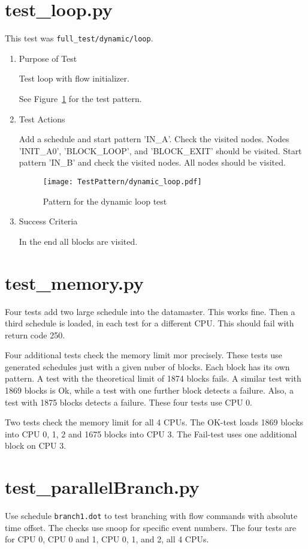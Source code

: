 \documentclass[12pt,a4paper]{report}
\begin{document}
\section{test\_loop.py}
This test was \texttt{full\_test/dynamic/loop}.
\begin{enumerate}
  \item Purpose of Test

        Test loop with flow initializer.

  See Figure~\ref{fig:Pattern_for_the_dynamic_loop_test} for the test pattern.
  \item Test Actions

        Add a schedule and start pattern 'IN\_A'. Check the visited nodes. Nodes 'INIT\_A0', 'BLOCK\_LOOP', and 'BLOCK\_EXIT'
        should be visited. Start pattern 'IN\_B' and check the visited nodes. All nodes should be visited.
    \begin{figure}
        \centering
        \texttt{[image: TestPattern/dynamic\_loop.pdf]}
        \caption{Pattern for the dynamic loop test}
        \label{fig:Pattern_for_the_dynamic_loop_test}
    \end{figure}
  \item Success Criteria

  In the end all blocks are visited.
\end{enumerate}
\section{test\_memory.py}
Four tests add two large schedule into the datamaster. This works fine.
Then a third schedule is loaded, in each test for a different CPU. This
should fail with return code 250.

Four additional tests check the memory limit mor precisely. These tests
use generated schedules just with a given nuber of blocks. Each block
has its own pattern. A test with the theoretical limit of 1874 blocks
fails. A similar test with 1869 blocks is Ok, while a test with one
further block detects a failure. Also, a test with 1875 blocks detects a
failure. These four tests use CPU 0.

Two tests check the memory limit for all 4 CPUs. The OK-test loads 1869
blocks into CPU 0, 1, 2 and 1675 blocks into CPU 3. The Fail-test uses
one additional block on CPU 3.

\section{test\_parallelBranch.py}
Use schedule \texttt{branch1.dot} to test branching with flow commands
with absolute time offset. The checks use snoop for specific event numbers.
The four tests are for CPU 0, CPU 0 and 1, CPU 0, 1, and 2, all 4 CPUs.
\end{document}
